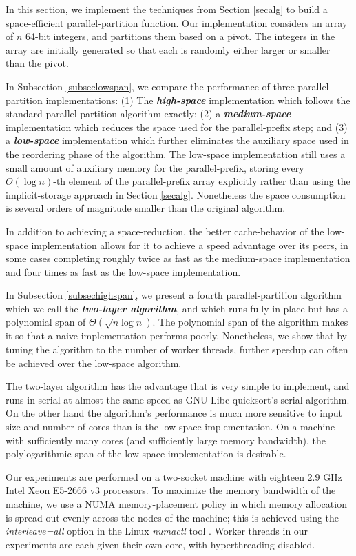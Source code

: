 \documentclass[sigconf]{acmart}
\newcommand{\defn}[1]       {{\textit{\textbf{\boldmath #1}}}}
\renewcommand{\paragraph}[1]{\vspace{0.09in}\noindent{\bf \boldmath #1.}}
\theoremstyle{remark}
\theoremstyle{remark}
\begin{document}
In this section, we implement the techniques from Section \ref{secalg}
to build a space-efficient parallel-partition function. Our
implementation considers an array of $n$ 64-bit integers, and
partitions them based on a pivot. The integers in the array are
initially generated so that each is randomly either larger or smaller
than the pivot.

In Subsection \ref{subseclowspan}, we compare the performance of three
parallel-partition implementations: (1) The \defn{high-space}
implementation which follows the standard parallel-partition algorithm
exactly; (2) a \defn{medium-space} implementation which reduces the
space used for the parallel-prefix step; and (3) a \defn{low-space}
implementation which further eliminates the auxiliary space used in the
reordering phase of the algorithm. The low-space implementation still
uses a small amount of auxiliary memory for the parallel-prefix,
storing every $O(\log n)$-th element of the parallel-prefix array
explicitly rather than using the implicit-storage approach in Section
\ref{secalg}. Nonetheless the space consumption is several orders of
magnitude smaller than the original algorithm.

In addition to achieving a space-reduction, the better cache-behavior
of the low-space implementation allows for it to achieve a speed
advantage over its peers, in some cases completing roughly twice as
fast as the medium-space implementation and four times as fast as the
low-space implementation.

In Subsection \ref{subsechighspan}, we present a fourth
parallel-partition algorithm which we call the \defn{two-layer
  algorithm}, and which runs fully in place but has a polynomial span
of $\Theta(\sqrt{n \log n})$. The polynomial span of the algorithm
makes it so that a naive implementation performs poorly. Nonetheless,
we show that by tuning the algorithm to the number of worker threads,
further speedup can often be achieved over the low-space algorithm.

The two-layer algorithm has the advantage that is very simple to
implement, and runs in serial at almost the same speed as GNU Libc
quicksort's serial algorithm. On the other hand the algorithm's
performance is much more sensitive to input size and number of cores
than is the low-space implementation. On a machine with sufficiently
many cores (and sufficiently large memory bandwidth), the
polylogarithmic span of the low-space implementation is desirable.


\paragraph{Machine Details}
Our experiments are performed on a two-socket machine with eighteen
2.9 GHz Intel Xeon E5-2666 v3 processors. To maximize the memory
bandwidth of the machine, we use a NUMA memory-placement policy in
which memory allocation is spread out evenly across the nodes of the
machine; this is achieved using the \emph{interleave=all} option in
the Linux \emph{numactl} tool \cite{Kleen05}. Worker threads in our
experiments are each given their own core, with hyperthreading
disabled.
\end{document}
